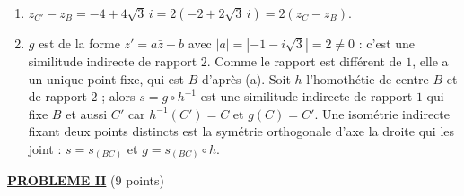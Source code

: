 \begin{description}
\begin{enumerate}
\begin{enumerate}
				\par\noindent{}
			\item {}
				$z_{C'} - z_B = -4 + 4\sqrt{3}\, i = 2\left(-2 + 2\sqrt{3}\, i\right) = 2\left(z_C - z_B\right)$.
				\par\noindent{}
			\item {}
				$g$ est de la forme $z' = a\bar{z} + b$ avec $|a| = \left|-1 - i\sqrt{3}\right| = 2 \neq 0$ : c'est une similitude indirecte de rapport $2$.
				Comme le rapport est différent de $1$, elle a un unique point fixe, qui est $B$ d'après (a).
				Soit $h$ l'homothétie de centre $B$ et de rapport $2$ ; alors $s = g \circ h^{-1}$ est une similitude indirecte de rapport $1$ qui fixe $B$
				et aussi $C'$ car $h^{-1}(C') = C$ et $g(C) = C'$. Une isométrie indirecte fixant deux points distincts est la symétrie orthogonale d'axe la droite qui les joint :
				$s = s_{(BC)}$ et $g = s_{(BC)} \circ h$.
				\par\noindent{}
		\end{enumerate}
	\end{enumerate}
\end{description}
\noindent \underline{\textsc{\textbf{PROBLEME II}}} (9 points)
